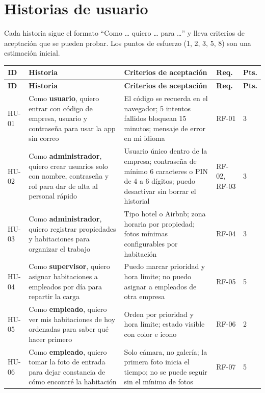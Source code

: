 \documentclass[11pt,a4paper]{article}
\begin{document}
\section{Historias de usuario}

Cada historia sigue el formato \enquote{Como \ldots{} quiero \ldots{} para \ldots} y lleva criterios de aceptación que se pueden probar. Los puntos de esfuerzo (1, 2, 3, 5, 8) son una estimación inicial.

{\small
\setlength{\tabcolsep}{4pt}
\begin{longtable}{L{1.1cm} L{5.5cm} L{5.9cm} L{1.4cm} L{0.8cm}}
\toprule
\textbf{ID} & \textbf{Historia} & \textbf{Criterios de aceptación} & \textbf{Req.} & \textbf{Pts.}\\
\midrule
\endfirsthead
\toprule
\textbf{ID} & \textbf{Historia} & \textbf{Criterios de aceptación} & \textbf{Req.} & \textbf{Pts.}\\
\midrule
\endhead
\bottomrule
\endfoot
HU-01 & Como \textbf{usuario}, quiero entrar con código de empresa, usuario y contraseña para usar la app sin correo & El código se recuerda en el navegador; 5 intentos fallidos bloquean 15 minutos; mensaje de error en mi idioma & RF-01 & 3\\
HU-02 & Como \textbf{administrador}, quiero crear usuarios solo con nombre, contraseña y rol para dar de alta al personal rápido & Usuario único dentro de la empresa; contraseña de mínimo 6 caracteres o PIN de 4 a 6 dígitos; puedo desactivar sin borrar el historial & RF-02, RF-03 & 3\\
HU-03 & Como \textbf{administrador}, quiero registrar propiedades y habitaciones para organizar el trabajo & Tipo hotel o Airbnb; zona horaria por propiedad; fotos mínimas configurables por habitación & RF-04 & 3\\
HU-04 & Como \textbf{supervisor}, quiero asignar habitaciones a empleados por día para repartir la carga & Puedo marcar prioridad y hora límite; no puedo asignar a empleados de otra empresa & RF-05 & 5\\
HU-05 & Como \textbf{empleado}, quiero ver mis habitaciones de hoy ordenadas para saber qué hacer primero & Orden por prioridad y hora límite; estado visible con color e icono & RF-06 & 2\\
HU-06 & Como \textbf{empleado}, quiero tomar la foto de entrada para dejar constancia de cómo encontré la habitación & Solo cámara, no galería; la primera foto inicia el tiempo; no se puede seguir sin el mínimo de fotos & RF-07 & 5\\

\end{longtable}}
\end{document}
